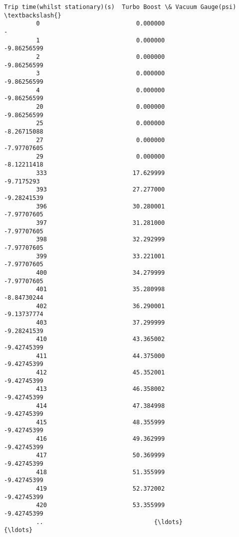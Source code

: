 \documentclass[11pt]{article}
\begin{document}
\begin{Verbatim}[commandchars=\\\{\}]
              Trip time(whilst stationary)(s)  Turbo Boost \& Vacuum Gauge(psi)  \textbackslash{}
         0                           0.000000                                -   
         1                           0.000000                      -9.86256599   
         2                           0.000000                      -9.86256599   
         3                           0.000000                      -9.86256599   
         4                           0.000000                      -9.86256599   
         20                          0.000000                      -9.86256599   
         25                          0.000000                      -8.26715088   
         27                          0.000000                      -7.97707605   
         29                          0.000000                      -8.12211418   
         333                        17.629999                       -9.7175293   
         393                        27.277000                      -9.28241539   
         396                        30.280001                      -7.97707605   
         397                        31.281000                      -7.97707605   
         398                        32.292999                      -7.97707605   
         399                        33.221001                      -7.97707605   
         400                        34.279999                      -7.97707605   
         401                        35.280998                      -8.84730244   
         402                        36.290001                      -9.13737774   
         403                        37.299999                      -9.28241539   
         410                        43.365002                      -9.42745399   
         411                        44.375000                      -9.42745399   
         412                        45.352001                      -9.42745399   
         413                        46.358002                      -9.42745399   
         414                        47.384998                      -9.42745399   
         415                        48.355999                      -9.42745399   
         416                        49.362999                      -9.42745399   
         417                        50.369999                      -9.42745399   
         418                        51.355999                      -9.42745399   
         419                        52.372002                      -9.42745399   
         420                        53.355999                      -9.42745399   
         ..                               {\ldots}                              {\ldots}   

\end{Verbatim}
\end{document}
